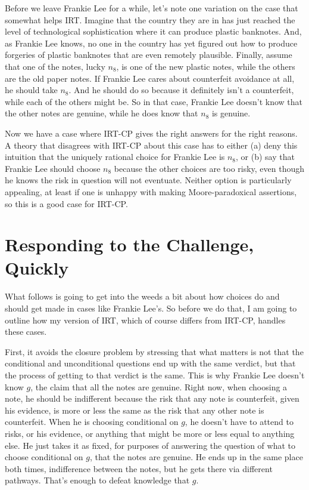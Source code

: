 \documentclass[11pt,]{book}
\begin{document}
Before we leave Frankie Lee for a while, let's note one variation on the case that somewhat helps IRT. Imagine that the country they are in has just reached the level of technological sophistication where it can produce plastic banknotes. And, as Frankie Lee knows, no one in the country has yet figured out how to produce forgeries of plastic banknotes that are even remotely plausible. Finally, assume that one of the notes, lucky \(n_8\), is one of the new plastic notes, while the others are the old paper notes. If Frankie Lee cares about counterfeit avoidance at all, he should take \(n_8\). And he should do so because it definitely isn't a counterfeit, while each of the others might be. So in that case, Frankie Lee doesn't know that the other notes are genuine, while he does know that \(n_8\) is genuine.

Now we have a case where IRT-CP gives the right answers for the right reasons. A theory that disagrees with IRT-CP about this case has to either (a) deny this intuition that the uniquely rational choice for Frankie Lee is \(n_8\), or (b) say that Frankie Lee should choose \(n_8\) because the other choices are too risky, even though he knows the risk in question will not eventuate. Neither option is particularly appealing, at least if one is unhappy with making Moore-paradoxical assertions, so this is a good case for IRT-CP.

\hypertarget{tiesresponse}{%
\section{Responding to the Challenge, Quickly}\label{tiesresponse}}

What follows is going to get into the weeds a bit about how choices do and should get made in cases like Frankie Lee's. So before we do that, I am going to outline how my version of IRT, which of course differs from IRT-CP, handles these cases.

First, it avoids the closure problem by stressing that what matters is not that the conditional and unconditional questions end up with the same verdict, but that the process of getting to that verdict is the same. This is why Frankie Lee doesn't know \(g\), the claim that all the notes are genuine. Right now, when choosing a note, he should be indifferent because the risk that any note is counterfeit, given his evidence, is more or less the same as the risk that any other note is counterfeit. When he is choosing conditional on \(g\), he doesn't have to attend to risks, or his evidence, or anything that might be more or less equal to anything else. He just takes it as fixed, for purposes of answering the question of what to choose conditional on \(g\), that the notes are genuine. He ends up in the same place both times, indifference between the notes, but he gets there via different pathways. That's enough to defeat knowledge that \(g\).
\end{document}
